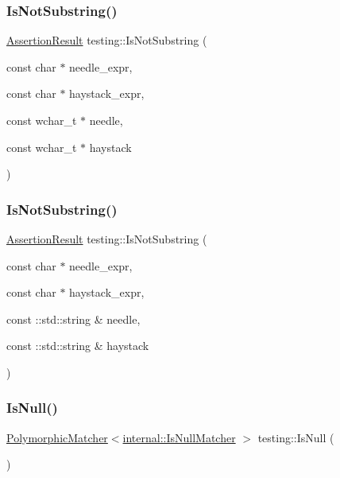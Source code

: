 \subsubsection{\texorpdfstring{Is\+Not\+Substring()}{IsNotSubstring()}\hspace{0.1cm}{\footnotesize\ttfamily [2/3]}}
{\footnotesize\ttfamily \hyperlink{classtesting_1_1_assertion_result}{Assertion\+Result} testing\+::\+Is\+Not\+Substring (\begin{DoxyParamCaption}\item[{const char $\ast$}]{needle\+\_\+expr,  }\item[{const char $\ast$}]{haystack\+\_\+expr,  }\item[{const wchar\+\_\+t $\ast$}]{needle,  }\item[{const wchar\+\_\+t $\ast$}]{haystack }\end{DoxyParamCaption})}

\mbox{\label{namespacetesting_abe7b3fa1c9528745f934d4a14155ea87}} 
\subsubsection{\texorpdfstring{Is\+Not\+Substring()}{IsNotSubstring()}\hspace{0.1cm}{\footnotesize\ttfamily [3/3]}}
{\footnotesize\ttfamily \hyperlink{classtesting_1_1_assertion_result}{Assertion\+Result} testing\+::\+Is\+Not\+Substring (\begin{DoxyParamCaption}\item[{const char $\ast$}]{needle\+\_\+expr,  }\item[{const char $\ast$}]{haystack\+\_\+expr,  }\item[{const \+::std\+::string \&}]{needle,  }\item[{const \+::std\+::string \&}]{haystack }\end{DoxyParamCaption})}

\mbox{\label{namespacetesting_a56ffb1a169c14ce585fc5bed32add2db}} 
\subsubsection{\texorpdfstring{Is\+Null()}{IsNull()}}
{\footnotesize\ttfamily \hyperlink{classtesting_1_1_polymorphic_matcher}{Polymorphic\+Matcher}$<$\hyperlink{classtesting_1_1internal_1_1_is_null_matcher}{internal\+::\+Is\+Null\+Matcher} $>$ testing\+::\+Is\+Null (\begin{DoxyParamCaption}{ }\end{DoxyParamCaption})\hspace{0.3cm}{\ttfamily [inline]}}

